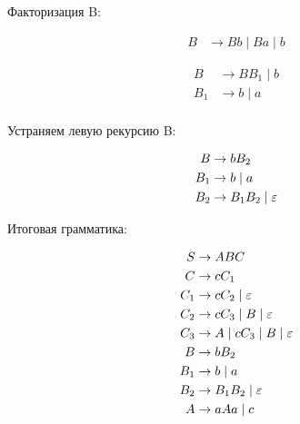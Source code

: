 Факторизация B:

\begin{align*}
B & \to B b  \;|\;  B a  \;|\;  b
\end{align*}

\begin{align*}
B & \to B B_1  \;|\;  b\\
B_1 & \to b  \;|\;  a\\
\end{align*}

Устраняем левую рекурсию B:

\begin{align*}
B & \to b B_2\\
B_1 & \to b  \;|\;  a\\
B_2 & \to B_1 B_2  \;|\;  \varepsilon\\
\end{align*}

Итоговая грамматика:

\begin{align*}
S & \to A B C\\
C & \to c C_1\\
C_1 & \to c C_2  \;|\;  \varepsilon\\
C_2 & \to c C_3  \;|\;  B  \;|\;  \varepsilon\\
C_3 & \to A  \;|\;  c C_3  \;|\;  B  \;|\;  \varepsilon\\
B & \to b B_2\\
B_1 & \to b  \;|\;  a\\
B_2 & \to B_1 B_2  \;|\;  \varepsilon\\
A & \to a A a  \;|\;  c \\
\end{align*}


